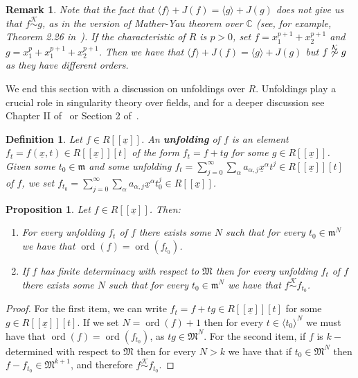 \documentclass{article}
\newtheorem{definition}[theorem]{Definition}
\newtheorem{proposition}[theorem]{Proposition}
\newtheorem{remark}[theorem]{Remark}
\DeclareMathOperator{\ord}{ord}
\newcommand{\equivk}{\overset{\mathcal{K}}{\sim}}
\numberwithin{theorem}{section}
\begin{document}
    
\begin{remark}
    \textup{Note that the fact that $\langle f \rangle + J(f) = \langle g \rangle + J(g)$ does not give us that $f \equivk g$, as in the version of Mather-Yau theorem over $\mathbb{C}$ (see, for example, Theorem 2.26 in~\cite{greuel2007introduction}). If the characteristic of $R$ is $p>0$, set $f=x_1^{p+1}+x_2^{p+1}$ and $g=x_1^p + x_1^{p+1}+x_2^{p+1}$. Then we have that $\langle f \rangle + J(f) = \langle g \rangle + J(g)$ but $f \not\equivk g$ as they have different orders.}
\end{remark}
 

We end this section with a discussion on unfoldings over $R$. Unfoldings play a crucial role in singularity theory over fields, and for a deeper discussion see Chapter II of~\cite{greuel2007introduction} or Section 2 of~\cite{greuel2016right}. 



\begin{definition}
    Let $f \in R[[\underline{x}]]$. An \textbf{unfolding} of $f$ is an element $f_t = f\left(\underline{x},t\right) \in R[[\underline{x}]][t]$ of the form $f_t = f +tg$ for some $g \in R[[\underline{x}]]$. Given some $t_0 \in \mathfrak{m}$ and some unfolding $f_t=\sum_{j=0}^\infty\sum_{\alpha} a_{{\alpha},j}\underline{x}^{\alpha}t^j \in R[[\underline{x}]][t]$ of $f$, we set $f_{t_0} = \sum_{j=0}^\infty\sum_{\alpha} a_{{\alpha},j}\underline{x}^{\alpha} t_0^j \in R[[\underline{x}]]$.
\end{definition}

 

\begin{proposition}\label{prop:semi}
    Let $f \in R[[\underline{x}]]$. Then:
    \begin{enumerate}
        \item For every unfolding $f_t$ of $f$ there exists some $N$ such that for every $t_0 \in \mathfrak{m}^N$ we have that $\ord\left(f\right) = \ord\left(f_{t_0}\right)$.
        \item If $f$ has finite determinacy with respect to $\mathfrak{M}$ then for every unfolding $f_t$ of $f$ there exists some $N$ such that for every $t_0 \in \mathfrak{m}^N$ we have that $f \equivk f_{t_0}$. 
    \end{enumerate}
     
    
\end{proposition}

\begin{proof}
For the first item, we can write $f_t = f + tg \in R[[\underline{x}]][t]$ for some $g \in R[[\underline{x}]][t]$. If we set $N=\ord\left(f\right)+1$ then for every $t \in \langle t_0 \rangle^N$ we must have that $\ord\left(f\right)=\ord\left(f_{t_0}\right)$, as $tg \in \mathfrak{M}^N$. For the second item, if $f$ is $k-$determined with respect to $\mathfrak{M}$ then for every $N>k$ we have that if $t_0 \in \mathfrak{M}^N$ then $f -f_{t_0} \in \mathfrak{M}^{k+1}$, and therefore $f \equivk f_{t_0}$.  
\end{proof}
\end{document}
